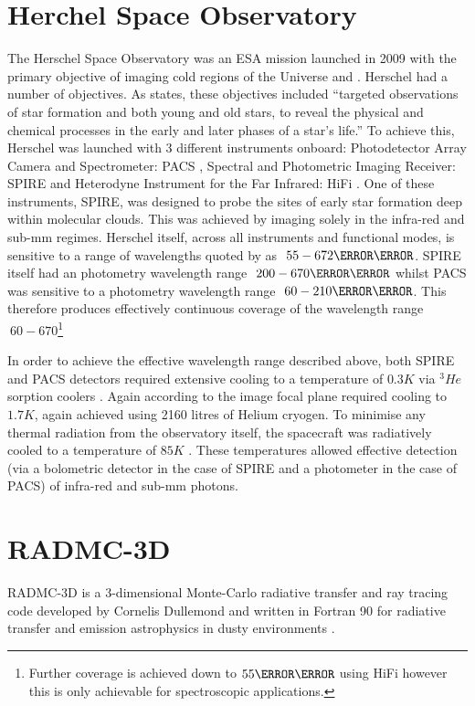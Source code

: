 \documentclass{report}
\begin{document}
\section{Herchel Space Observatory}
The Herschel Space Observatory was an ESA mission launched in 2009 with the primary objective of imaging cold regions of the Universe \parencite{herschel} and \parencite{fact}. Herschel had a number of objectives. As \textcite{fact} states, these objectives included ``targeted observations of star formation and both young and old stars, to reveal the physical and chemical processes in the early and later phases of a star’s life.'' To achieve this, Herschel was launched with 3 different instruments onboard: Photodetector Array Camera and Spectrometer: PACS \parencite{PACS}, Spectral and Photometric Imaging Receiver: SPIRE \parencite{SPIRE} and Heterodyne Instrument for the Far Infrared: HiFi \parencite{HiFi}. One of these instruments, SPIRE, was designed to probe the sites of early star formation deep within molecular clouds. This was achieved by imaging solely in the infra-red and sub-mm regimes. Herschel itself, across all instruments and functional modes, is sensitive to a range of wavelengths quoted by \textcite{herschel} as $~55-672 \micro\meter$. SPIRE itself had an photometry wavelength range $~200-670 \micro\meter$ whilst PACS was sensitive to a photometry wavelength range $~60-210 \micro\meter$. This therefore produces effectively continuous coverage of the wavelength range $~60-670$\footnote{Further coverage is achieved down to $55 \micro\meter$ using HiFi however this is only achievable for spectroscopic applications.}

In order to achieve the effective wavelength range described above, both SPIRE and PACS detectors required extensive cooling to a temperature of $0.3 K$ via $^{3}{He}$ sorption coolers \parencite{herschel}. Again according to \textcite{herschel} the image focal plane required cooling to $1.7 K$, again achieved using 2160 litres of Helium cryogen. To minimise any thermal radiation from the observatory itself, the spacecraft was radiatively cooled to a temperature of $85 K$ \parencite{herschel}. These temperatures allowed effective detection (via a bolometric detector in the case of SPIRE and a photometer in the case of PACS) of infra-red and sub-mm photons. 

\section{RADMC-3D} \label{radmc}
RADMC-3D is a 3-dimensional Monte-Carlo radiative transfer and ray tracing code developed by Cornelis Dullemond and written in Fortran 90 for radiative transfer and emission astrophysics in dusty environments \parencite{RADMC-3D}.
\end{document}
